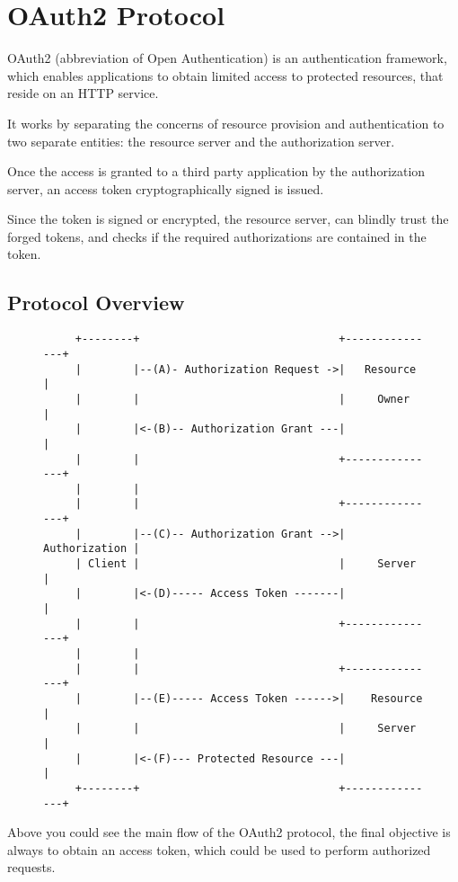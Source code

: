 
\section{OAuth2 Protocol}
OAuth2 (abbreviation of Open Authentication) is an authentication framework,
which enables applications to obtain limited access to protected resources,
that reside on an HTTP service.

It works by separating the concerns of resource provision and authentication to
two separate entities: the resource server and the authorization server.

Once the access is granted to a third party application by the authorization server,
an access token cryptographically signed is issued.

Since the token is signed or encrypted, the resource server, can blindly trust
the forged tokens, and checks if the required authorizations are contained in
the token.


\subsection{Protocol Overview}
\begin{figure}[h]
    \centering
    \begin{verbatim}
     +--------+                               +---------------+
     |        |--(A)- Authorization Request ->|   Resource    |
     |        |                               |     Owner     |
     |        |<-(B)-- Authorization Grant ---|               |
     |        |                               +---------------+
     |        |
     |        |                               +---------------+
     |        |--(C)-- Authorization Grant -->| Authorization |
     | Client |                               |     Server    |
     |        |<-(D)----- Access Token -------|               |
     |        |                               +---------------+
     |        |
     |        |                               +---------------+
     |        |--(E)----- Access Token ------>|    Resource   |
     |        |                               |     Server    |
     |        |<-(F)--- Protected Resource ---|               |
     +--------+                               +---------------+
    \end{verbatim}
\end{figure}
Above you could see the main flow of the OAuth2 protocol, the final objective is
always to obtain an access token, which could be used to perform authorized
requests.


